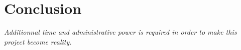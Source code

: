 \section{Conclusion}

\textit{Additionnal time and administrative power is required in order to
make this project become reality.}

